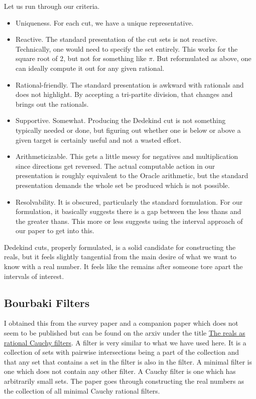 \documentclass[12pt]{article}
\theoremstyle{remark}
\begin{document}
Let us run through our criteria. 

\begin{itemize}
    \item Uniqueness. For each cut, we have a unique representative.
    \item Reactive. The standard presentation of the cut sets is not reactive. Technically, one would need to specify the set entirely. This works for the square root of 2, but not for something like $\pi$. But reformulated as above, one can ideally compute it out for any given rational. 
    \item Rational-friendly. The standard presentation is awkward with rationals and does not highlight. By accepting a tri-partite division, that changes and brings out the rationals. 
    \item Supportive. Somewhat. Producing the Dedekind cut is not something typically needed or done, but figuring out whether one is below or above a given target is certainly useful and not a wasted effort. 
    \item Arithmeticizable. This gets a little messy for negatives and multiplication since directions get reversed. The actual computable action in our presentation is roughly equivalent to the Oracle arithmetic, but the standard presentation demands the whole set be produced which is not possible.
    \item Resolvability. It is obscured, particularly the standard formulation. For our formulation, it basically suggests there is a gap between the less thans and the greater thans. This more or less suggests using the interval approach of our paper to get into this. 
\end{itemize}

Dedekind cuts, properly formulated, is a solid candidate for constructing the reals, but it feels slightly tangential from the main desire of what we want to know with a real number. It feels like the remains after someone tore apart the intervals of interest. 

\subsection{Bourbaki Filters}

I obtained this from the survey paper \cite{ittay-2015} and a companion paper which does not seem to be published but can be found on the arxiv under the title \href{https://arxiv.org/abs/1503.04348v3}{The reals as rational Cauchy filters}. A filter is very similar to what we have used here. It is a collection of sets with pairwise intersections being a part of the collection and that any set that contains a set in the filter is also in the filter. A minimal filter is one which does not contain any other filter. A Cauchy filter is one which has arbitrarily small sets. The paper goes through constructing the real numbers as the collection of all minimal Cauchy rational filters. 
\end{document}
